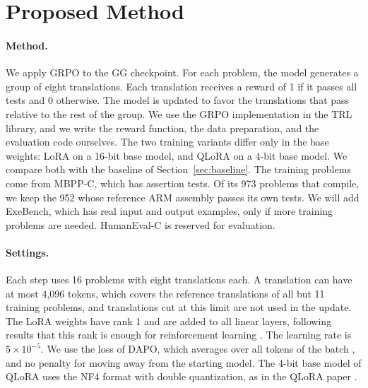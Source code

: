 \documentclass{article}
\newif\iftracked
\newcommand{\added}[1]{\iftracked\hl{#1}\else#1\fi}
\newcommand{\deleted}[1]{\iftracked\textcolor{red}{\st{#1}}\ \fi}
\begin{document}
\section{Proposed Method}
\label{sec:method}

\paragraph{Method.}
We apply GRPO to the GG checkpoint. For each problem, the model generates a group of eight translations. Each translation receives a reward of 1 if it passes all tests and 0 otherwise. The model is updated to favor the translations that pass relative to the rest of the group. We use the GRPO implementation in the TRL library, and we write the reward function, the data preparation, and the evaluation code ourselves. The two training variants differ only in the base weights: LoRA on a 16-bit base model, and QLoRA on a 4-bit base model. We compare both with the baseline of Section~\ref{sec:baseline}. The training problems come from MBPP-C, which has assertion tests\deleted{, and ExeBench, which has real input and output examples}. \added{Of its 973 problems that compile, we keep the 952 whose reference ARM assembly passes its own tests. We will add ExeBench, which has real input and output examples, only if more training problems are needed.} HumanEval-C is reserved for evaluation. \deleted{We expect to use 100 to 300 training steps per variant with identical settings.}

\paragraph{\added{Settings.}}
\added{Each step uses 16 problems with eight translations each. A translation can have at most 4,096 tokens, which covers the reference translations of all but 11 training problems, and translations cut at this limit are not used in the update. The LoRA weights have rank 1 and are added to all linear layers, following results that this rank is enough for reinforcement learning} \citep{lorawithoutregret}\added{. The learning rate is} $5\times10^{-5}$\added{.} \added{We use the loss of DAPO, which averages over all tokens of the batch} \citep{dapo}\added{, and no penalty for moving away from the starting model. The 4-bit base model of QLoRA uses the NF4 format with double quantization, as in the QLoRA paper} \citep{qlora}\added{.}
\end{document}
